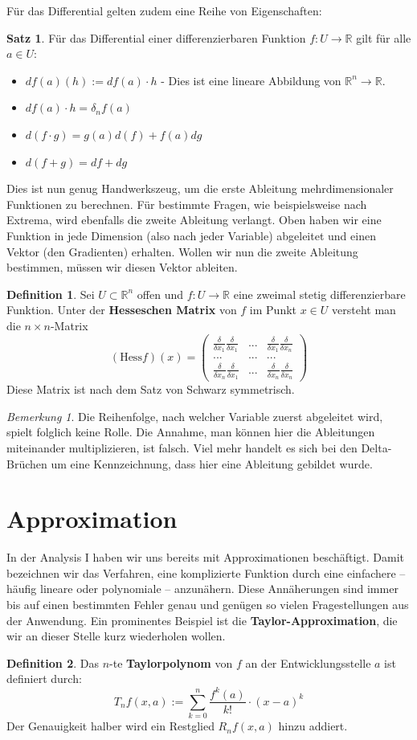 \documentclass[11pt,a4paper]{scrartcl}
\theoremstyle{remark}
\newtheorem{note}{Bemerkung}
\theoremstyle{definition}
\newtheorem{definition}{Definition}[section]
\newtheorem{satz}{Satz}[section]
\begin{document}
Für das Differential gelten zudem eine Reihe von Eigenschaften:
\begin{satz}
Für das Differential einer differenzierbaren Funktion $f: U \to \mathbb{R}$ gilt für alle $a \in U$:
\begin{itemize}
\item $df(a)(h) := df(a) \cdot h$ - Dies ist eine lineare Abbildung von $\mathbb{R}^n \to \mathbb{R}$.
\item $df(a)\cdot h = \delta _n f(a)$ 
\item $d(f \cdot g) = g(a)d(f) + f(a)dg$
\item $d(f+g) = df + dg$ 
\end{itemize}
\end{satz}
Dies ist nun genug Handwerkszeug, um die erste Ableitung mehrdimensionaler Funktionen zu berechnen. Für bestimmte Fragen, wie beispielsweise nach Extrema, wird ebenfalls die zweite Ableitung verlangt. Oben haben wir eine Funktion in jede Dimension (also nach jeder Variable) abgeleitet und einen Vektor (den Gradienten) erhalten. Wollen wir nun die zweite Ableitung bestimmen, müssen wir diesen Vektor ableiten. 
\begin{definition}
Sei $U \subset \mathbb{R}^n$ offen und $f: U \to \mathbb{R}$ eine zweimal stetig differenzierbare Funktion. Unter der \textbf{Hesseschen Matrix} von $f$ im Punkt $x \in U$ versteht man die $n \times n$-Matrix
\[(\text{Hess} f)(x) = \left( \begin{matrix} \frac{\delta}{\delta x_1} \frac{\delta}{\delta x_1} & ... & \frac{\delta}{\delta x_1}\frac{\delta}{\delta x_n} \\
... & ... & ... \\
\frac{\delta}{\delta x_n}\frac{\delta}{\delta x_1} & ... & \frac{\delta}{\delta x_n}\frac{\delta}{\delta x_n} \end{matrix}\right)\]
Diese Matrix ist nach dem Satz von Schwarz symmetrisch.
\end{definition}
\begin{note}
Die Reihenfolge, nach welcher Variable zuerst abgeleitet wird, spielt folglich keine Rolle. Die Annahme, man können hier die Ableitungen miteinander multiplizieren, ist falsch. Viel mehr handelt es sich bei den Delta-Brüchen um eine Kennzeichnung, dass hier eine Ableitung gebildet wurde.
\end{note}
\section{Approximation}
In der Analysis I haben wir uns bereits mit Approximationen beschäftigt. Damit bezeichnen wir das Verfahren, eine komplizierte Funktion durch eine einfachere -- häufig lineare oder polynomiale -- anzunähern. Diese Annäherungen sind immer bis auf einen bestimmten Fehler genau und genügen so vielen Fragestellungen aus der Anwendung.
Ein prominentes Beispiel ist die \textbf{Taylor-Approximation}, die wir an dieser Stelle kurz wiederholen wollen.
\begin{definition} Das $n$-te \textbf{Taylorpolynom} von $f$ an der Entwicklungsstelle $a$ ist definiert durch:
\[T_n f(x, a) := \sum\limits _{k=0}^{n} \frac{f^{k}(a)}{k!} \cdot (x-a)^k\]
Der Genauigkeit halber wird ein Restglied $R_n f(x,a)$ hinzu addiert.
\end{definition}
\end{document}
